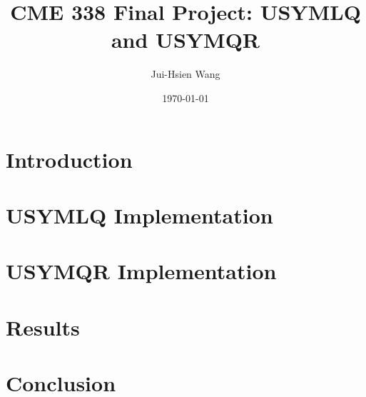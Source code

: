 \documentclass[10pt,letterpaper]{article}
\begin{document}
\linespread{1} %
\small \normalsize %
\title{CME 338 Final Project: USYMLQ and USYMQR}
\date{\today}
\author{Jui-Hsien Wang}
\maketitle
\section{Introduction}


\section{USYMLQ Implementation} 



\section{USYMQR Implementation} 



\section{Results} 





\section{Conclusion} 


\end{document}
